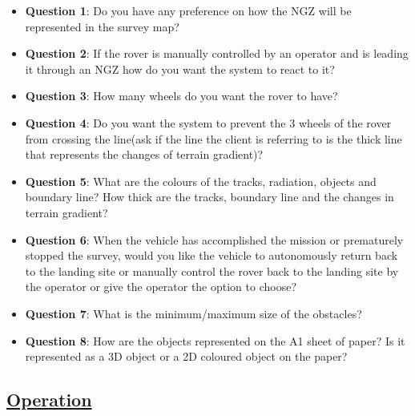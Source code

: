 \documentclass[11pt, a4paper]{article}
\begin{document}
\begin{itemize}

\item[] \textbf{Question 1}: Do you have any preference on how the NGZ will be represented in the survey map?

\item[] \textbf{Question 2}: If the rover is manually controlled by an operator and is leading it through an NGZ how do you want the system to react to it?

\item[] \textbf{Question 3}: How many wheels do you want the rover to have?

\item[] \textbf{Question 4}: Do you want the system to prevent the 3 wheels of the rover from crossing the line(ask if the line the client is referring to is the thick line that represents the changes of terrain gradient)?

\item[] \textbf{Question 5}: What are the colours of the tracks, radiation, objects and boundary line? How thick are the tracks, boundary line and the changes in terrain gradient?

\item[] \textbf{Question 6}: When the vehicle has accomplished the mission or prematurely stopped the survey, would you like the vehicle to autonomously return back to the landing site or manually control the rover back to the landing site by the operator or give the operator the option to choose?

\item[] \textbf{Question 7}: What is the minimum/maximum size of the obstacles?

\item[] \textbf{Question 8}: How are the objects represented on the A1 sheet of paper? Is it represented as a 3D object or a 2D coloured object on the paper?

\end{itemize}

\subsection{\underline{Operation}}
\end{document}

